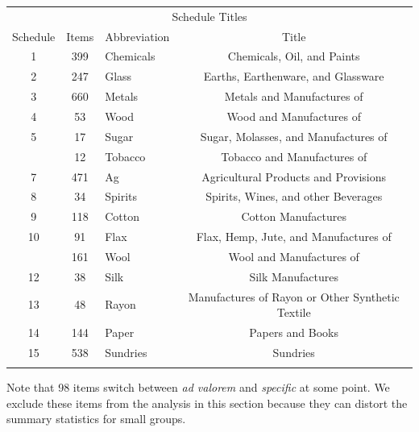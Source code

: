 \documentclass[
  12pt,
]{article}
\begin{document}
\begin{table}[!h]
\centering
\begin{tabular}{cclc}
\toprule
\multicolumn{4}{c}{\bgroup\fontsize{12}{14}\selectfont Schedule Titles\egroup{}} \\
\cmidrule(l{3pt}r{3pt}){1-4}{}
Schedule & Items & Abbreviation & Title\\
\midrule{}
1 & 399 & Chemicals & Chemicals, Oil, and Paints\\
2 & 247 & Glass & Earths, Earthenware, and Glassware\\
3 & 660 & Metals & Metals and Manufactures of\\
4 & 53 & Wood & Wood and Manufactures of\\
5 & 17 & Sugar & Sugar, Molasses, and Manufactures of\\
\addlinespace
6 & 12 & Tobacco & Tobacco and Manufactures of\\
7 & 471 & Ag & Agricultural Products and Provisions\\
8 & 34 & Spirits & Spirits, Wines, and other Beverages\\
9 & 118 & Cotton & Cotton Manufactures\\
10 & 91 & Flax & Flax, Hemp, Jute, and Manufactures of\\
\addlinespace
11 & 161 & Wool & Wool and Manufactures of\\
12 & 38 & Silk & Silk Manufactures\\
13 & 48 & Rayon & Manufactures of Rayon or Other Synthetic Textile\\
14 & 144 & Paper & Papers and Books\\
15 & 538 & Sundries & Sundries\\
\bottomrule{}
\end{tabular}
\end{table}

Note that 98 items switch between \emph{ad valorem} and \emph{specific} at some point. We exclude these items from the analysis in this section because they can distort the summary statistics for small groups.
\end{document}
